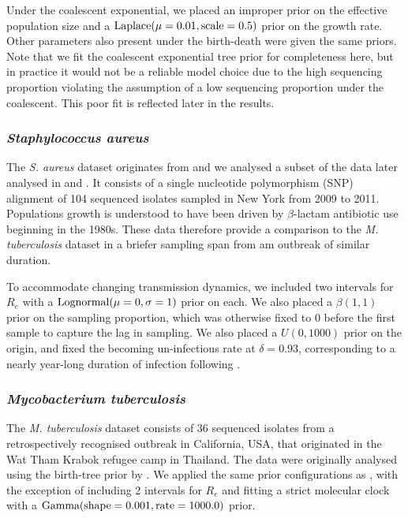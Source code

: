 \documentclass[12pt]{article}
\begin{document}
\begin{spacing}{2}
Under the coalescent exponential, we placed an improper prior on the effective population size and a $\textnormal{Laplace}(\mu=0.01,\textnormal{scale}=0.5)$ prior on the growth rate. Other parameters also present under the birth-death were given the same priors. Note that we fit the coalescent exponential tree prior for completeness here, but in practice it would not be a reliable model choice due to the high sequencing proportion violating the assumption of a low sequencing proportion under the coalescent. This poor fit is reflected later in the results.

\subsubsection*{\textit{Staphylococcus aureus}}
The \textit{S. aureus} dataset originates from \citet{uhlemann_molecular_2014} and we analysed a subset of the data later analysed in \citet{duchene_2016_genome} and \citet{volz_modeling_2018}. It consists of a single nucleotide polymorphism (SNP) alignment of 104 sequenced isolates sampled in New York from 2009 to 2011. Populations growth is understood to have been driven by $\beta$-lactam antibiotic use beginning in the 1980s. These data therefore provide a comparison to the \textit{M. tuberculosis} dataset in a briefer sampling span from am outbreak of similar duration.

To accommodate changing transmission dynamics, we included two intervals for $R_e$ with a $\textnormal{Lognormal}(\mu=0,\sigma=1)$ prior on each. We also placed a $\beta(1,1)$ prior on the sampling proportion, which was otherwise fixed to 0 before the first sample to capture the lag in sampling. We also placed a $U(0,1000)$ prior on the origin, and fixed the becoming un-infectious rate at $\delta=0.93$, corresponding to a nearly year-long duration of infection following \citet{volz_modeling_2018}.

\subsubsection*{\textit{Mycobacterium tuberculosis}}
The \textit{M. tuberculosis} dataset consists of 36 sequenced isolates from a retrospectively recognised outbreak in California, USA, that originated in the Wat Tham Krabok refugee camp in Thailand. The data were originally analysed using the birth-tree prior by \citet{kuhnert_tuberculosis_2018}. We applied the same prior configurations as \citet{kuhnert_tuberculosis_2018}, with the exception of including 2 intervals for $R_e$ and fitting a strict molecular clock with a $\textnormal{Gamma}(\textnormal{shape}=0.001,\textnormal{rate}=1000.0)$ prior.


\end{spacing}
\end{document}
